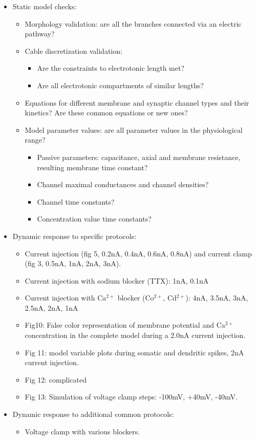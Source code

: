 \documentclass[12pt]{article}
\begin{document}
\begin{itemize}
\item Static model checks:
  \begin{itemize}
  \item Morphology validation: are all the branches connected via an
    electric pathway?
  \item Cable discretization validation:
    \begin{itemize}
    \item Are the constraints to electrotonic length met?
    \item Are all electrotonic compartments of similar lengths?
    \end{itemize}
  \item Equations for different membrane and synaptic channel types
    and their kinetics?  Are these common equations or new ones?
  \item Model parameter values: are all parameter values in the
    physiological range?
    \begin{itemize}
    \item Passive parameters: capacitance, axial and membrane
      resistance, resulting membrane time constant?
    \item Channel maximal conductances and channel densities?
    \item Channel time constants?
    \item Concentration value time constants?
    \end{itemize}
  \end{itemize}
\item Dynamic response to specific protocols:
  \begin{itemize}
  \item Current injection (fig 5, 0.2nA, 0.4nA, 0.6nA, 0.8nA) and
    current clamp (fig 3, 0.5nA, 1nA, 2nA, 3nA).
  \item Current injection with sodium blocker (TTX): 1nA, 0.1nA
  \item Current injection with Ca$^{2+}$ blocker (Co$^{2+}$,
    Cd$^{2+}$): 4nA, 3.5nA, 3nA, 2.5nA, 2nA, 1nA
  \item Fig10: False color representation of membrane potential and Ca$^{2+}$
    concentration in the complete model during a 2.0nA current
    injection.
  \item Fig 11: model variable plots during somatic and dendritic
    spikes, 2nA current injection.
  \item Fig 12: complicated
  \item Fig 13: Simulation of voltage clamp steps: -100mV, +40mV,
    -40mV.
  \end{itemize}
\item Dynamic response to additional common protocols:
  \begin{itemize}
  \item Voltage clamp with various blockers.
  \end{itemize}

\end{itemize}
\end{document}

